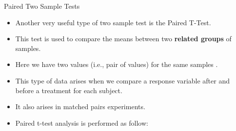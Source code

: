 \documentclass[handout]{beamer}
\begin{document}
\begin{frame}{Paired Two Sample Tests}
 \scriptsize{

\begin{itemize}
 
 \item Another very useful type of two sample test is the Paired T-Test.
 \item This test is used to compare the means between two \textbf{related groups} of samples.
 \item Here we have two values (i.e., pair of values) for the same samples \cite{sthda}.
 \item This type of data arises when we compare a response variable after and before a treatment for each subject.
 \item It also arises in matched pairs experiments.
 
 \item Paired t-test analysis is performed as follow:

 


\end{itemize}



}
\end{frame}
\end{document}
